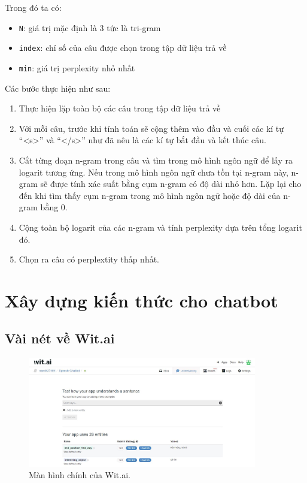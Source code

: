 \documentclass[12pt]{report}
\begin{document}
Trong đó ta có:

\begin{itemize}
	\item \texttt{N}: giá trị mặc định là 3 tức là tri-gram
	\item \texttt{index}: chỉ số của câu được chọn trong tập dữ liệu trả về
	\item \texttt{min}: giá trị perplexity nhỏ nhất
\end{itemize}

Các bước thực hiện như sau:

\begin{enumerate}
	\item Thực hiện lặp toàn bộ các câu trong tập dữ liệu trả về
	\item Với mỗi câu, trước khi tính toán sẽ cộng thêm vào đầu và cuối các kí tự ``<s>'' và ``</s>'' như đã nêu là các kí tự bắt đầu và kết thúc câu.
	\item Cắt từng đoạn n-gram trong câu và tìm trong mô hình ngôn ngữ để lấy ra logarit tương ứng. Nếu trong mô hình ngôn ngữ chưa tồn tại n-gram này, n-gram sẽ được tính xác suất bằng cụm n-gram có độ dài nhỏ hơn. Lặp lại cho đến khi tìm thấy cụm n-gram trong mô hình ngôn ngữ hoặc độ dài của n-gram bằng 0.
	\item Cộng toàn bộ logarit của các n-gram và tính perplexity dựa trên tổng logarit đó.
	\item Chọn ra câu có perplextity thấp nhất.
\end{enumerate}

\section{Xây dựng kiến thức cho chatbot}

\subsection{Vài nét về Wit.ai}

\begin{figure}[H] \label{fig:mainboard-wit}
	\centering
	\includegraphics[width=10cm]{Pics/Chap6/wit-mainboard.JPG}
	\caption{Màn hình chính của Wit.ai.}
\end{figure}
\end{document}
